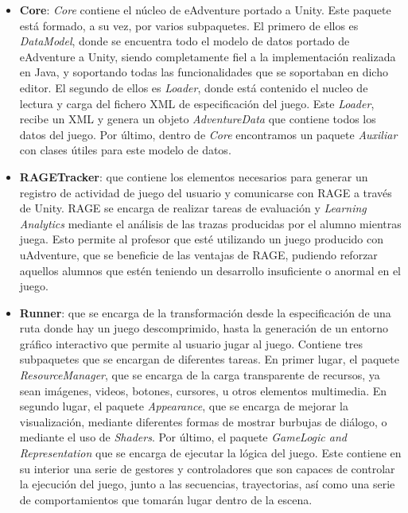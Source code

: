 \begin{itemize}
	\item \textbf{Core}: \textit{Core} contiene el núcleo de eAdventure portado a Unity. Este paquete está formado, a su vez, por varios subpaquetes. El primero de ellos es \textit{DataModel}, donde se encuentra todo el modelo de datos portado de eAdventure a Unity, siendo completamente fiel a la implementación realizada en Java, y soportando todas las funcionalidades que se soportaban en dicho editor. El segundo de ellos es \textit{Loader}, donde está contenido el nucleo de lectura y carga del fichero XML de especificación del juego. Este \textit{Loader}, recibe un XML y genera un objeto \textit{AdventureData} que contiene todos los datos del juego. Por último, dentro de \textit{Core} encontramos un paquete \textit{Auxiliar} con clases útiles para este modelo de datos.
	
	\item \textbf{RAGETracker}: que contiene los elementos necesarios para generar un registro de actividad de juego del usuario y comunicarse con RAGE a través de Unity. RAGE se encarga de realizar tareas de evaluación y \textit{Learning Analytics} mediante el análisis de las trazas producidas por el alumno mientras juega. Esto permite al profesor que esté utilizando un juego producido con uAdventure, que se beneficie de las ventajas de RAGE, pudiendo reforzar aquellos alumnos que estén teniendo un desarrollo insuficiente o anormal en el juego.
	
	\item \textbf{Runner}: que se encarga de la transformación desde la especificación de una ruta donde hay un juego descomprimido, hasta la generación de un entorno gráfico interactivo que permite al usuario jugar al juego. Contiene tres subpaquetes que se encargan de diferentes tareas. En primer lugar, el paquete \textit{ResourceManager}, que se encarga de la carga transparente de recursos, ya sean imágenes, videos, botones, cursores, u otros elementos multimedia. En segundo lugar, el paquete \textit{Appearance}, que se encarga de mejorar la visualización, mediante diferentes formas de mostrar burbujas de diálogo, o mediante el uso de \textit{Shaders}. Por último, el paquete \textit{GameLogic and Representation} que se encarga de ejecutar la lógica del juego. Este contiene en su interior una serie de gestores y controladores que son capaces de controlar la ejecución del juego, junto a las secuencias, trayectorias, así como una serie de comportamientos que tomarán lugar dentro de la escena.
\end{itemize}

